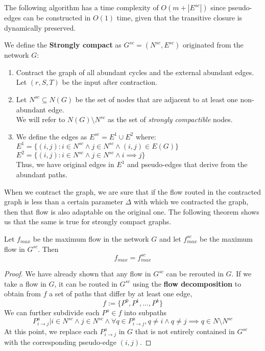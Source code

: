The following algorithm has a time complexity of \(O(m + |E^{sc}|)\) since pseudo-edges can be constructed in \(O(1)\) time, given that the transitive closure is dynamically preserved.

\begin{definition}

    We define the \textbf{Strongly compact} as \(G^{sc} =(N^{sc}, E^{sc})\) originated from the network \(G\):
    \begin{enumerate}
        \item Contract the graph of all abundant cycles and the external abundant edges.\\
        Let \((r,S,T)\) be the input after contraction.
        \item Let \(N^{sc}\subseteq N(G)\) be the set of nodes that are adjacent to at least one non-abundant edge.\\
        We will refer to \(N(G)\setminus N^{sc}\) as the set of \textit{strongly compactible} nodes.
        \item We define the edges as \(E^{sc} = E^1 \cup E^2\) where:\\
        \(E^1 = \{(i,j): i\in N^{sc}\land j\in N^{sc}\land (i,j)\in E(G)\}\)\\
        \(E^2 = \{(i,j): i\in N^{sc}\land j\in N^{sc}\land i\implies j\}\)\\
        Thus, we have original edges in \(E^1\) and pseudo-edges that derive from the abundant paths.
    \end{enumerate}
\end{definition}

When we contract the graph, we are sure that if the flow routed in the contracted graph is less than a certain parameter \(\Delta\) with which we contracted the graph, then that flow is also adaptable on the original one. The following theorem shows us that the same is true for strongly compact graphs.
\newpage

\begin{theorem}[$f_{max} = f_{max}^{sc}$]

    \label{fmaxfsc}
    Let \(f_{max}\) be the maximum flow in the network \(G\) and let \(f_{max}^{sc}\) be the maximum flow in \(G^{sc}\). Then 
    \[f_{max} = f_{max}^{sc}\]
\end{theorem}

\begin{proof}
    We have already shown that any flow in \(G^{sc}\) can be rerouted in \(G\).
    If we take a flow in \(G\), it can be routed in \(G^{sc}\) using the \textbf{flow decomposition} to obtain from \(f\) a set of paths that differ by at least one edge,
    \[f := \{P^0, P^1, ..., P^k\}\]
    We can further subdivide each \(P^a\in f\) into subpaths \[P^{a}_{i\rightarrow j}| i\in N^{sc}\land j\in N^{sc}\land \forall q \in P^a_{i\rightarrow j}, q\not = i \land q\not = j \implies q\in N\setminus N^{sc}\] 
    At this point, we replace each \(P^{a}_{i\rightarrow j}\) in \(G\) that is not entirely contained in \(G^{sc}\) with the corresponding pseudo-edge \((i,j)\).

\end{proof}



